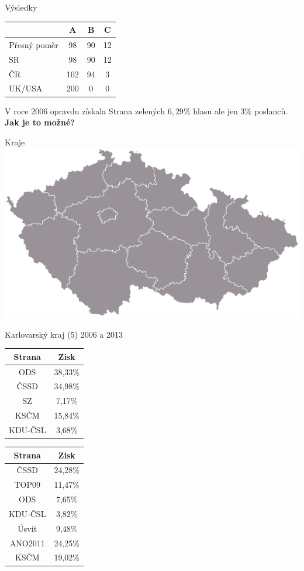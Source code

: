 \documentclass[17pt]{beamer}
\begin{document}
\begin{frame}{Výsledky}
\begin{center}
\begin{tabular}{|l|c|c|c|} \hline
  & A & B & C \\ \hline 
Přesný poměr & 98 & 90 & 12\\ \hline
SR & 98 & 90 & 12\\ \hline
ČR & 102 & 94 & 3\\ \hline
UK/USA & 200 & 0 & 0\\ \hline
\end{tabular}
\end{center} 
V roce 2006 opravdu získala Strana zelených $6{,}29\%$ hlasu ale jen $3\%$ poslanců. 
\textbf{Jak je to možné?}
\end{frame}

\begin{frame}{Kraje}
\includegraphics[scale=0.1]{zdroje/kraje.png}
\end{frame}

\begin{frame}{Karlovarský kraj (5) 2006 a 2013}
\begin{center}
\begin{tabular}{|c|c|}
\hline
Strana  & Zisk    \\ \hline
ODS     & 38,33\% \\ \hline
ČSSD    & 34,98\% \\ \hline
SZ      & 7,17\%  \\ \hline
KSČM    & 15,84\% \\ \hline
KDU-ČSL & 3,68\%  \\ \hline
\end{tabular}
\begin{tabular}{|c|c|}
\hline
Strana  & Zisk    \\ \hline
ČSSD    & 24,28\% \\ \hline
TOP09   & 11,47\% \\ \hline
ODS     & 7,65\%  \\ \hline
KDU-ČSL & 3,82\%  \\ \hline
Úsvit   & 9,48\%  \\ \hline
ANO2011 & 24,25\% \\ \hline
KSČM    & 19,02\% \\ \hline
\end{tabular}
\end{center}
\end{frame}
\end{document}
